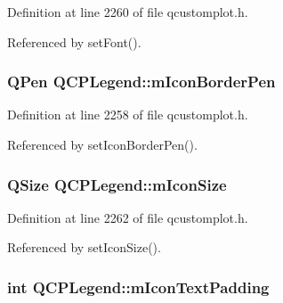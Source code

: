 Definition at line 2260 of file qcustomplot.\+h.



Referenced by set\+Font().

\hypertarget{class_q_c_p_legend_a773ae518c3149fcabff4a2906fdacbc4}{}
\subsubsection[{m\+Icon\+Border\+Pen}]{\setlength{\rightskip}{0pt plus 5cm}Q\+Pen Q\+C\+P\+Legend\+::m\+Icon\+Border\+Pen\hspace{0.3cm}{\ttfamily [protected]}}\label{class_q_c_p_legend_a773ae518c3149fcabff4a2906fdacbc4}


Definition at line 2258 of file qcustomplot.\+h.



Referenced by set\+Icon\+Border\+Pen().

\hypertarget{class_q_c_p_legend_a39b972aae6c6a3fa5aa73313ab7a5765}{}
\subsubsection[{m\+Icon\+Size}]{\setlength{\rightskip}{0pt plus 5cm}Q\+Size Q\+C\+P\+Legend\+::m\+Icon\+Size\hspace{0.3cm}{\ttfamily [protected]}}\label{class_q_c_p_legend_a39b972aae6c6a3fa5aa73313ab7a5765}


Definition at line 2262 of file qcustomplot.\+h.



Referenced by set\+Icon\+Size().

\hypertarget{class_q_c_p_legend_a8abf8843864ee9afc3f54f906c062240}{}
\subsubsection[{m\+Icon\+Text\+Padding}]{\setlength{\rightskip}{0pt plus 5cm}int Q\+C\+P\+Legend\+::m\+Icon\+Text\+Padding\hspace{0.3cm}{\ttfamily [protected]}}\label{class_q_c_p_legend_a8abf8843864ee9afc3f54f906c062240}


